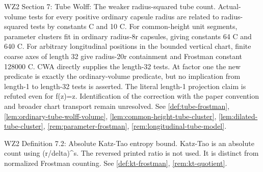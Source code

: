 \begin{remark}
\label{rem:atlas-W2TW}
WZ2 Section 7: Tube Wolff: The weaker radius-squared tube count.
Actual-volume tests for every positive ordinary capsule radius are related to radius-squared tests by constants C and 10 C. For common-height unit segments, parameter clusters fit in ordinary radius-8r capsules, giving constants 64 C and 640 C. For arbitrary longitudinal positions in the bounded vertical chart, finite coarse axes of length 32 give radius-20r containment and Frostman constant 128000 C. CWA directly supplies the length-32 tests. At factor one the new predicate is exactly the ordinary-volume predicate, but no implication from length-1 to length-32 tests is asserted. The literal length-1 projection claim is refuted even for f(z)=z. Identification of the correction with the paper convention and broader chart transport remain unresolved.
See \ref{def:tube-frostman}, \ref{lem:ordinary-tube-wolff-volume}, \ref{lem:common-height-tube-cluster}, \ref{lem:dilated-tube-cluster}, \ref{rem:parameter-frostman}, \ref{rem:longitudinal-tube-model}.
\end{remark}

\begin{remark}
\label{rem:atlas-W2DKT}
WZ2 Definition 7.2: Absolute Katz-Tao entropy bound.
Katz-Tao is an absolute count using (r/delta)\textasciicircum{}s. The reversed printed ratio is not used. It is distinct from normalized Frostman counting.
See \ref{def:kt-frostman}, \ref{rem:kt-quotient}.
\end{remark}

